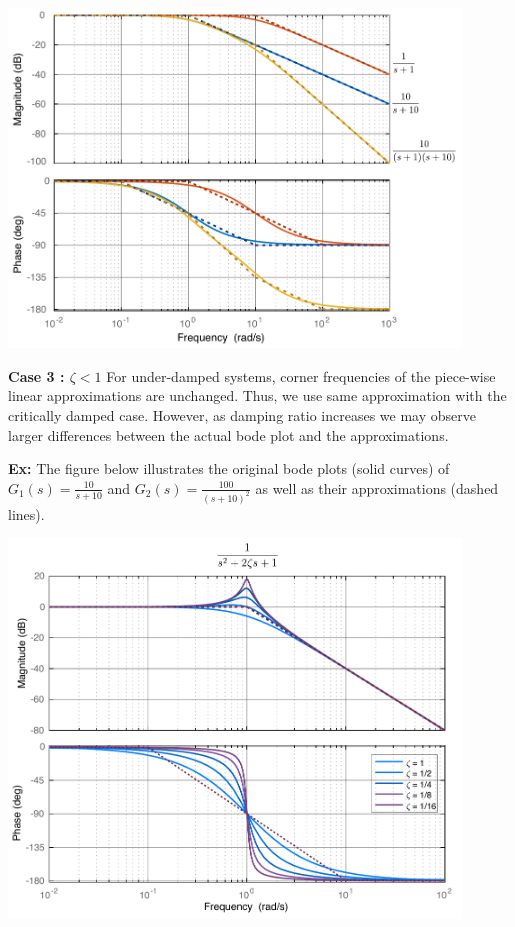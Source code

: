 \documentclass[twoside]{article}
\begin{document}
\vspace{6 pt}

  \begin{minipage}[h]{1\linewidth}
    \begin{center}
      \includegraphics[width=0.9\textwidth]{over}
    \end{center}
  \end{minipage}

\newpage

\textbf{Case 3 : $\zeta < 1$} For under-damped systems, corner frequencies 
of the piece-wise linear approximations are unchanged. Thus, we use same 
approximation with the critically damped case. However, as damping ratio 
increases we may observe larger differences between the actual bode plot
and the approximations. 

\textbf{Ex:} The figure below
illustrates the original bode plots (solid curves) of $G_1(s) = \frac{10}{s+10}$ and $G_2(s) = \frac{100}{(s+10)^2}$ as well as
their approximations (dashed lines). 

\vspace{6 pt}

  \begin{minipage}[h]{1\linewidth}
    \begin{center}
      \includegraphics[width=0.9\textwidth]{under}
    \end{center}
  \end{minipage}
\end{document}

